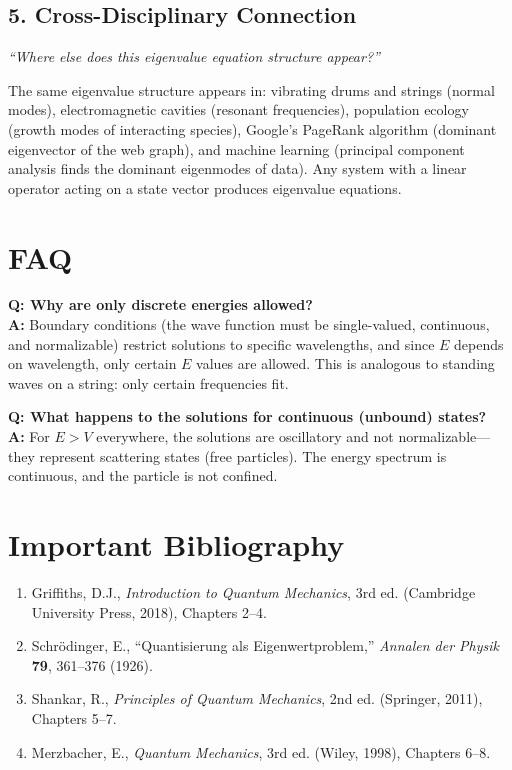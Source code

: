 \subsection*{5. Cross-Disciplinary Connection}
\textit{``Where else does this eigenvalue equation structure appear?''}

The same eigenvalue structure appears in: vibrating drums and strings (normal modes), electromagnetic cavities (resonant frequencies), population ecology (growth modes of interacting species), Google's PageRank algorithm (dominant eigenvector of the web graph), and machine learning (principal component analysis finds the dominant eigenmodes of data). Any system with a linear operator acting on a state vector produces eigenvalue equations.
\section*{FAQ}

\textbf{Q: Why are only discrete energies allowed?}\\
\textbf{A:} Boundary conditions (the wave function must be single-valued, continuous, and normalizable) restrict solutions to specific wavelengths, and since $E$ depends on wavelength, only certain $E$ values are allowed. This is analogous to standing waves on a string: only certain frequencies fit.

\textbf{Q: What happens to the solutions for continuous (unbound) states?}\\
\textbf{A:} For $E > V$ everywhere, the solutions are oscillatory and not normalizable---they represent scattering states (free particles). The energy spectrum is continuous, and the particle is not confined.
\section*{Important Bibliography}

\begin{enumerate}
\item Griffiths, D.J., \textit{Introduction to Quantum Mechanics}, 3rd ed. (Cambridge University Press, 2018), Chapters 2--4.
\item Schr\"odinger, E., ``Quantisierung als Eigenwertproblem,'' \textit{Annalen der Physik} \textbf{79}, 361--376 (1926).
\item Shankar, R., \textit{Principles of Quantum Mechanics}, 2nd ed. (Springer, 2011), Chapters 5--7.
\item Merzbacher, E., \textit{Quantum Mechanics}, 3rd ed. (Wiley, 1998), Chapters 6--8.
\end{enumerate}

